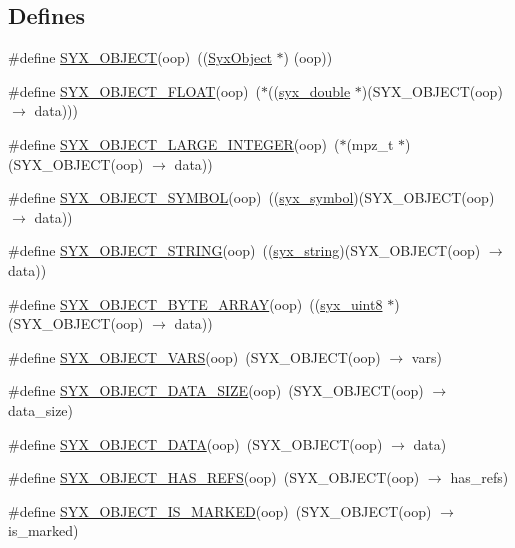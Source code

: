 \subsection*{Defines}
\begin{CompactItemize}
\item 
\#define \hyperlink{syx-object_8h_cfb2a79cbeaf42326b56948d009d6719}{SYX\_\-OBJECT}(oop)~((\hyperlink{struct_syx_object}{SyxObject} $\ast$) (oop))
\item 
\#define \hyperlink{syx-object_8h_5421190920571a4e33c3dbf3b9ef61b1}{SYX\_\-OBJECT\_\-FLOAT}(oop)~($\ast$((\hyperlink{syx-types_8h_cc7fcb78741daa005b6897ad40b7472b}{syx\_\-double} $\ast$)(SYX\_\-OBJECT(oop) $\rightarrow$ data)))
\item 
\#define \hyperlink{syx-object_8h_65df887ffb379b9452e3e6796532ada5}{SYX\_\-OBJECT\_\-LARGE\_\-INTEGER}(oop)~($\ast$(mpz\_\-t $\ast$)(SYX\_\-OBJECT(oop) $\rightarrow$ data))
\item 
\#define \hyperlink{syx-object_8h_5b9c62927be3b204756647a1ee461d1d}{SYX\_\-OBJECT\_\-SYMBOL}(oop)~((\hyperlink{syx-types_8h_9663af54b7b72f5d8be5f754ef356525}{syx\_\-symbol})(SYX\_\-OBJECT(oop) $\rightarrow$ data))
\item 
\#define \hyperlink{syx-object_8h_d9120176c6ebd87a4075472386e6f748}{SYX\_\-OBJECT\_\-STRING}(oop)~((\hyperlink{syx-types_8h_1bff1fd86072dd98849437bc9dcb35c3}{syx\_\-string})(SYX\_\-OBJECT(oop) $\rightarrow$ data))
\item 
\#define \hyperlink{syx-object_8h_e935c367e62b3662eb89fcb98fb173b6}{SYX\_\-OBJECT\_\-BYTE\_\-ARRAY}(oop)~((\hyperlink{syx-types_8h_7cb1870b8124a88e807c98f315f3d923}{syx\_\-uint8} $\ast$)(SYX\_\-OBJECT(oop) $\rightarrow$ data))
\item 
\#define \hyperlink{syx-object_8h_4b6aa57daec9c56e87fe8948101d99bc}{SYX\_\-OBJECT\_\-VARS}(oop)~(SYX\_\-OBJECT(oop) $\rightarrow$ vars)
\item 
\#define \hyperlink{syx-object_8h_6739da61250709a86d303df2aa297758}{SYX\_\-OBJECT\_\-DATA\_\-SIZE}(oop)~(SYX\_\-OBJECT(oop) $\rightarrow$ data\_\-size)
\item 
\#define \hyperlink{syx-object_8h_fc625eb398e3bd73c520d54112da754f}{SYX\_\-OBJECT\_\-DATA}(oop)~(SYX\_\-OBJECT(oop) $\rightarrow$ data)
\item 
\#define \hyperlink{syx-object_8h_b769a5f497b0d4a69c82db6ab587c96f}{SYX\_\-OBJECT\_\-HAS\_\-REFS}(oop)~(SYX\_\-OBJECT(oop) $\rightarrow$ has\_\-refs)
\item 
\#define \hyperlink{syx-object_8h_b510a0c36e6c8a70adde04426625ca7a}{SYX\_\-OBJECT\_\-IS\_\-MARKED}(oop)~(SYX\_\-OBJECT(oop) $\rightarrow$ is\_\-marked)

\end{CompactItemize}

